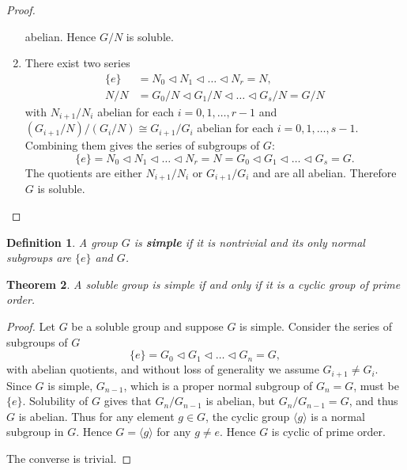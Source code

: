 \documentclass[12pt]{article}
\newtheorem{theorem}{Theorem}
\newtheorem{definition}[theorem]{Definition}
\begin{document}
\begin{proof}
\begin{enumerate}
              abelian.
              Hence $G / N$ is soluble.
        \item There exist two series
              $$
                  \begin{aligned}
                      \{ e \} & =N_0 \triangleleft N_1 \triangleleft \ldots
                      \triangleleft N_r=N,                                   \\
                      N / N   & =G_0 / N \triangleleft G_1 / N \triangleleft
                      \ldots \triangleleft G_s /
                      N=G / N
                  \end{aligned}
              $$
              with $N_{i+1} / N_{i}$ abelian for each $i = 0, 1, \dots, r-1$
              and $(G_{i+1} /
                  N)  / (G_{i} / N) \cong G_{i+1} / G_i $ abelian for each $i =
                  0,1, \dots, s-1$.
              Combining them gives the series of subgroups of $G$:
              $$
                  \{ e \}=N_0 \triangleleft N_1 \triangleleft \ldots
                  \triangleleft N_r=N=G_0
                  \triangleleft G_1 \triangleleft \ldots \triangleleft G_s=G .
              $$
              The quotients are either $N_{i+1} / N_i$	or $G_{i+1} / G_i$ and
              are all
              abelian. Therefore $G$ is soluble.
    \end{enumerate}
\end{proof}

\begin{definition}
    A group $G$ is \textbf{simple} if it is nontrivial and its only normal
    subgroups are $\{ e \}$ and $G$.
\end{definition}

\begin{theorem} \label{thm:soluble-and-simple}
    A soluble group is simple if and only if it is a cyclic group of prime
    order.
\end{theorem}

\begin{proof}
    Let $G$ be a soluble group and suppose $G$ is simple. Consider the series
    of subgroups of $G$
    $$
        \{ e \}=G_0 \triangleleft G_1 \triangleleft \ldots \triangleleft G_n=G,
    $$
    with abelian quotients, and without loss of generality we assume $G_{i+1}
        \neq
        G_i$. Since $G$ is simple, $G_{n-1}$, which is a proper normal subgroup
    of $G_n
        = G$, must be $\{ e \}$. Solubility of $G$ gives that $G_n / G_{n -1 }$
    is
    abelian, but $G_n / G_{n - 1} = G$, and thus $G$ is abelian. Thus for any
    element $g \in G$, the cyclic group $\langle g\rangle$ is a normal subgroup
    in
    $G$. Hence	$G = \langle g\rangle$ for any $g \neq e$. Hence $G$ is cyclic
    of
    prime order.

    The converse is trivial.
\end{proof}
\end{document}

